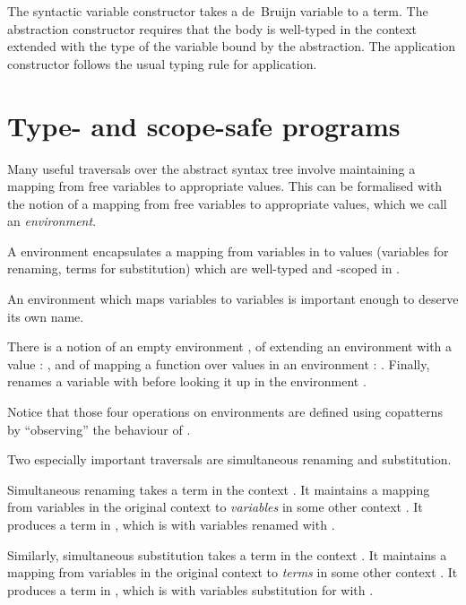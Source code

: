 \documentclass[bsc,frontabs,oneside,singlespacing,parskip,deptreport]{infthesis}
\theoremstyle{definition}
\theoremstyle{lemma}
\begin{document}
The syntactic variable  constructor takes a de~Bruijn variable to
a term. The abstraction constructor  requires that the body is
well-typed in the context  extended with the type  of the
variable bound by the abstraction. The application constructor
 follows the usual typing rule for application.

\section{Type- and scope-safe programs}
\label{sec:typ-scop-saf-prog}

Many useful traversals over the abstract syntax tree involve
maintaining a mapping from free variables to appropriate values. This
can be formalised with the notion of a mapping from free variables to
appropriate values, which we call an \textit{environment}.


A environment  encapsulates a mapping from variables in
 to values  (variables for renaming, terms for
substitution) which are well-typed and -scoped in .

An environment which maps variables to variables is important enough
to deserve its own name.


There is a notion of an empty environment , of extending an
environment  with a value : , and of mapping a
function  over values in an environment : . Finally,  renames a variable with 
before looking it up in the environment .


Notice that those four operations on environments are defined using
copatterns \cite{DBLP:conf/popl/AbelPTS13} by ``observing'' the
behaviour of .

Two especially important traversals are simultaneous renaming and
substitution.

Simultaneous renaming takes a term  in the context . It maintains
a mapping  from variables in the original context  to
\textit{variables} in some other context . It produces a term in
, which is  with variables renamed with .

Similarly, simultaneous substitution takes a term  in the context
. It maintains a mapping  from variables in the original context
 to \textit{terms} in some other context . It produces a
term in , which is  with variables substitution for with .
\end{document}
